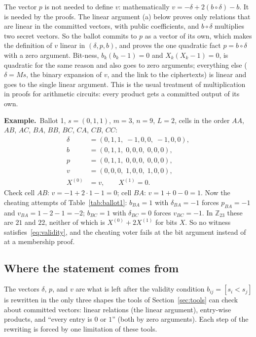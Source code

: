 \documentclass[11pt,a4paper]{article}
\newcommand{\Z}{\mathbb{Z}}
\newcommand{\ex}[1]{\par\medskip\noindent\textbf{Example.}~#1\par\medskip}
\theoremstyle{remark}
\begin{document}
The vector $p$ is not needed to define $v$: mathematically $v = -\delta +
2(b \circ \delta) - b$. It is needed by the proofs. The linear argument
(a) below proves only relations that are linear in the committed vectors,
with public coefficients, and $b \circ \delta$ multiplies two secret
vectors. So the ballot commits to $p$ as a vector of its own, which makes
the definition of $v$ linear in $(\delta, p, b)$, and proves the one
quadratic fact $p = b \circ \delta$ with a zero argument. Bit-ness,
$b_k(b_k - 1) = 0$ and $X_k(X_k - 1) = 0$, is quadratic for the same
reason and also goes to zero arguments; everything else ($\delta = Ms$, the
binary expansion of $v$, and the link to the ciphertexts) is linear and goes
to the single linear argument. This is the usual treatment of
multiplication in proofs for arithmetic circuits: every product gets a
committed output of its own.

\ex{Ballot 1, $s = (0, 1, 1)$, $m = 3$, $n = 9$, $L = 2$, cells in the
order $AA$, $AB$, $AC$, $BA$, $BB$, $BC$, $CA$, $CB$, $CC$:
\begin{align*}
  \delta &= (0, 1, 1,\; -1, 0, 0,\; -1, 0, 0), \\
  b &= (0, 1, 1,\; 0, 0, 0,\; 0, 0, 0), \\
  p &= (0, 1, 1,\; 0, 0, 0,\; 0, 0, 0), \\
  v &= (0, 0, 0,\; 1, 0, 0,\; 1, 0, 0), \\
  X^{(0)} &= v, \qquad X^{(1)} = 0 .
\end{align*}
Check cell $AB$: $v = -1 + 2 \cdot 1 - 1 = 0$; cell $BA$: $v = 1 + 0 - 0 =
1$. Now the cheating attempts of Table~\ref{tab:ballot1}: $b_{BA} = 1$ with
$\delta_{BA} = -1$ forces $p_{BA} = -1$ and $v_{BA} = 1 - 2 - 1 = -2$;
$b_{BC} = 1$ with $\delta_{BC} = 0$ forces $v_{BC} = -1$. In $\Z_{23}$
these are $21$ and $22$, neither of which is $X^{(0)} + 2 X^{(1)}$ for bits
$X$. So no witness satisfies~\eqref{eq:validity}, and the cheating voter
fails at the bit argument instead of at a membership proof.}

\subsection{Where the statement comes from}
The vectors $\delta$, $p$, and $v$ are what is left after the validity
condition $b_{ij} = [s_i < s_j]$ is rewritten in the only three shapes the
tools of Section~\ref{sec:tools} can check about committed vectors: linear
relations (the linear argument), entry-wise products, and ``every entry is
$0$ or $1$'' (both by zero arguments). Each step of the rewriting is forced
by one limitation of these tools.
\end{document}
